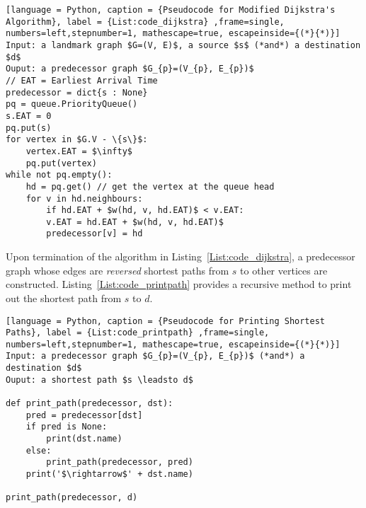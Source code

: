 \begin{lstlisting}[language = Python, caption = {Pseudocode for Modified Dijkstra's Algorithm}, label = {List:code_dijkstra} ,frame=single, numbers=left,stepnumber=1, mathescape=true, escapeinside={(*}{*)}]
Input: a landmark graph $G=(V, E)$, a source $s$ (*and*) a destination $d$
Ouput: a predecessor graph $G_{p}=(V_{p}, E_{p})$
// EAT = Earliest Arrival Time
predecessor = dict{s : None}
pq = queue.PriorityQueue()
s.EAT = 0
pq.put(s)
for vertex in $G.V - \{s\}$:
    vertex.EAT = $\infty$
    pq.put(vertex)
while not pq.empty():
    hd = pq.get() // get the vertex at the queue head
    for v in hd.neighbours:
    	if hd.EAT + $w(hd, v, hd.EAT)$ < v.EAT:
	    v.EAT = hd.EAT + $w(hd, v, hd.EAT)$
	    predecessor[v] = hd
\end{lstlisting}

Upon termination of the algorithm in Listing~\ref{List:code_dijkstra}, a predecessor graph whose edges are \emph{reversed} shortest paths from $s$ to other vertices are constructed. Listing~\ref{List:code_printpath} provides a recursive method to print out the shortest path from $s$ to $d$. 

\begin{lstlisting}[language = Python, caption = {Pseudocode for Printing Shortest Paths}, label = {List:code_printpath} ,frame=single, numbers=left,stepnumber=1, mathescape=true, escapeinside={(*}{*)}]
Input: a predecessor graph $G_{p}=(V_{p}, E_{p})$ (*and*) a destination $d$
Ouput: a shortest path $s \leadsto d$

def print_path(predecessor, dst):
    pred = predecessor[dst]
    if pred is None:
    	print(dst.name)
    else:
    	print_path(predecessor, pred)
	print('$\rightarrow$' + dst.name)
	
print_path(predecessor, d)
\end{lstlisting}